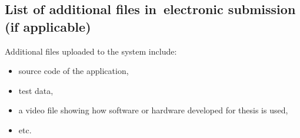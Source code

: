 \documentclass[a4paper,twoside,12pt]{book}
\begin{document}
\begin{appendices}
\chapter{List of additional files in~electronic submission (if applicable)}


Additional files uploaded to the system include:
\begin{itemize}
\item source code of the application,
\item test data,
\item a video file showing how software or hardware developed for thesis is used,
\item etc.
\end{itemize} 
\listoffigures
{}
\listoftables
{}

\end{appendices}
\end{document}
